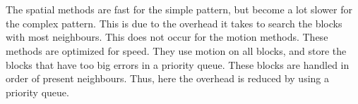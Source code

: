 \section[Conclusions regarding the comparison of the different results (for the spatial and
temporal techniques separately, as well as for the comparison of both approaches).]{}
The spatial methods are fast for the simple pattern, but become a lot slower for the complex pattern. This is due to the overhead it takes to search the blocks with most neighbours. This does not occur for the motion methods. These methods are optimized for speed. They use motion on all blocks, and store the blocks that have too big errors in a priority queue. These blocks are handled in order of present neighbours. Thus, here the overhead is reduced by using a priority queue.